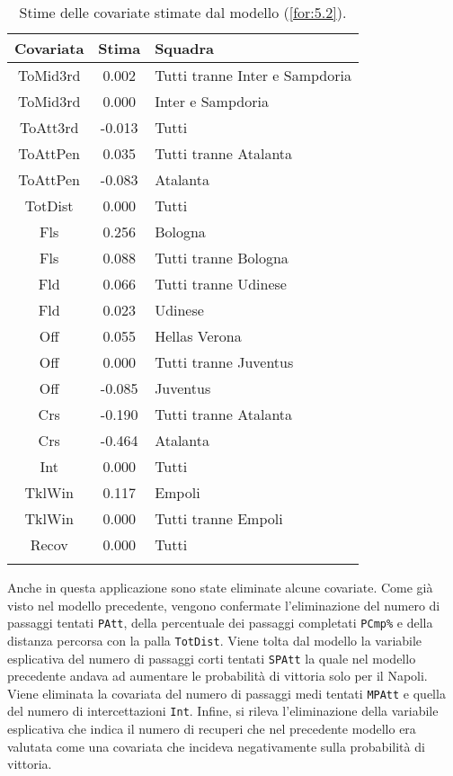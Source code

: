 \begin{table}[]%
	
	\renewcommand{\arraystretch}{1.7}
	\centering
	\begin{tabular}{ccp{10cm}}
		\hline	
		
		\textbf{Covariata} & \textbf{Stima} & \textbf{Squadra} \\	
		\hline
		ToMid3rd & 0.002 & Tutti tranne Inter e Sampdoria\\
		ToMid3rd & 0.000 & Inter e Sampdoria\\
		ToAtt3rd & -0.013 & Tutti \\  
		ToAttPen & 0.035 & Tutti tranne Atalanta \\    
		ToAttPen & -0.083 & Atalanta \\ 	     	 
		TotDist & 0.000 & Tutti \\	
		Fls & 0.256 & Bologna  \\
		Fls & 0.088 & Tutti tranne Bologna \\ 		
		Fld & 0.066 & Tutti tranne Udinese \\
		Fld & 0.023 & Udinese \\
		Off & 0.055 & Hellas Verona\\
		Off & 0.000 & Tutti tranne Juventus\\
		Off & -0.085 & Juventus  \\
		Crs & -0.190 & Tutti tranne Atalanta\\
		Crs & -0.464 & Atalanta \\
		Int & 0.000 & Tutti\\
		TklWin &  0.117 & Empoli  \\
		TklWin &  0.000 & Tutti tranne Empoli  \\ 
		Recov &  0.000 & Tutti \\ 
		\hline
		& &  \\
		
	\end{tabular} \hbox{}
	\caption{Stime delle covariate stimate dal modello (\ref{for:5.2}).} \label{tab:BTCLI3} 
	
\end{table}
Anche in questa applicazione sono state eliminate alcune covariate. Come già visto nel modello precedente, vengono confermate l'eliminazione del numero di passaggi tentati \texttt{PAtt}, della percentuale dei passaggi completati \texttt{PCmp\%} e della distanza percorsa con la palla \texttt{TotDist}. Viene tolta dal modello la variabile esplicativa del numero di passaggi corti tentati \texttt{SPAtt} la quale nel modello precedente andava ad aumentare le probabilità di vittoria solo per il Napoli. Viene eliminata la covariata del numero di passaggi medi tentati \texttt{MPAtt} e quella del numero di intercettazioni \texttt{Int}. Infine, si rileva l'eliminazione della variabile esplicativa che indica il numero di recuperi che nel precedente modello era valutata come una covariata che incideva negativamente sulla probabilità di vittoria.\\
